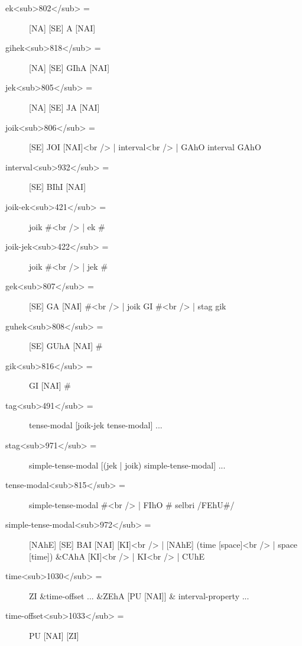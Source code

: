 \begin{description}
\hyperref[html:y802]{}
\item[ek<sub>802</sub> =] [NA] [SE] A [NAI] \label{html:b818}
\hyperref[html:y818]{}
\item[gihek<sub>818</sub> =] [NA] [SE] GIhA [NAI] \label{html:b805}
\hyperref[html:y805]{}
\item[jek<sub>805</sub> =] [NA] [SE] JA [NAI] \label{html:b806}
\hyperref[html:y806]{}
\item[joik<sub>806</sub> =] [SE] JOI [NAI]<br /> | interval<br /> | GAhO interval GAhO \label{html:b932}
\hyperref[html:y932]{}
\item[interval<sub>932</sub> =] [SE] BIhI [NAI] \label{html:b421}
\hyperref[html:y421]{}
\item[joik-ek<sub>421</sub> =] joik #<br /> | ek # \label{html:b422}
\hyperref[html:y422]{}
\item[joik-jek<sub>422</sub> =] joik #<br /> | jek # \label{html:b807}
\hyperref[html:y807]{}
\item[gek<sub>807</sub> =] [SE] GA [NAI] #<br /> | joik GI #<br /> | stag gik \label{html:b808}
\hyperref[html:y808]{}
\item[guhek<sub>808</sub> =] [SE] GUhA [NAI] # \label{html:b816}
\hyperref[html:y816]{}
\item[gik<sub>816</sub> =] GI [NAI] # \label{html:b491}
\hyperref[html:y491]{}
\item[tag<sub>491</sub> =] tense-modal [joik-jek tense-modal] ... \label{html:b971}
\hyperref[html:y971]{}
\item[stag<sub>971</sub> =] simple-tense-modal [(jek | joik) simple-tense-modal] ... \label{html:b815}
\hyperref[html:y815]{}
\item[tense-modal<sub>815</sub> =] simple-tense-modal #<br /> | FIhO # selbri /FEhU#/ \label{html:b972}
\hyperref[html:y972]{}
\item[simple-tense-modal<sub>972</sub> =] [NAhE] [SE] BAI [NAI] [KI]<br /> | [NAhE] (time [space]<br /> | space [time]) \&CAhA [KI]<br /> | KI<br /> | CUhE \label{html:b1030}
\hyperref[html:y1030]{}
\item[time<sub>1030</sub> =] ZI \&time-offset ... \&ZEhA [PU [NAI]] \&      interval-property ... \label{html:b1033}
\hyperref[html:y1033]{}
\item[time-offset<sub>1033</sub> =] PU [NAI] [ZI] \label{html:b1040}

\end{description}
